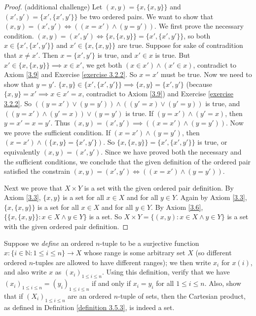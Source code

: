 \begin{proof}{(additional challenge)}
Let \((x, y) = \{x, \{x, y\}\}\) and \((x', y') = \{x', \{x', y'\}\}\) be two ordered pairs.
We want to show that \((x, y) = (x', y') \iff ((x = x') \land (y = y'))\).
We first prove the necessary condition.
\((x, y) = (x', y') \iff \{x, \{x, y\}\} = \{x', \{x', y'\}\}\), so both \(x \in \{x', \{x', y'\}\}\) and \(x' \in \{x, \{x, y\}\}\) are true.
Suppose for sake of contradition that \(x \neq x'\).
Then \(x = \{x', y'\}\) is true, and \(x' \in x\) is true.
But \(x' \in \{x, \{x, y\}\} \implies x \in x'\), we get both \((x \in x') \land (x' \in x)\), contradict to Axiom \ref{3.9} and Exercise \ref{exercise 3.2.2}.
So \(x = x'\) must be true.
Now we need to show that \(y = y'\).
\(\{x, y\} \in \{x', \{x', y'\}\} \implies \{x, y\} = \{x', y'\}\) (because \(\{x, y\} = x' \implies x \in x' = x\), contradict to Axiom \ref{3.9}) and Exercise \ref{exercise 3.2.2}.
So \(((y = x') \lor (y = y')) \land ((y' = x) \lor (y' = y))\) is true, and \(((y = x') \land (y' = x)) \lor (y = y')\) is true.
If \((y = x') \land (y' = x)\), then \(y = x' = x = y'\).
Thus \((x, y) = (x', y') \implies ((x = x') \land (y = y'))\).
Now we prove the sufficient condition.
If \((x = x') \land (y = y')\), then \((x = x') \land (\{x, y\} = \{x', y'\})\).
So \(\{x, \{x, y\}\} = \{x', \{x', y'\}\}\) is true, or equivalently \((x, y) = (x', y')\).
Since we have proved both the necessary and the sufficient conditions, we conclude that the given definition of the ordered pair satisfied the constrain \((x, y) = (x', y') \iff ((x = x') \land (y = y'))\).

Next we prove that \(X \times Y\) is a set with the given ordered pair definition.
By Axiom \ref{3.3}, \(\{x, y\}\) is a set for all \(x \in X\) and for all \(y \in Y\).
Again by Axiom \ref{3.3}, \(\{x, \{x, y\}\}\) is a set for all \(x \in X\) and for all \(y \in Y\).
By Axiom \ref{3.6}, \(\{\{x, \{x, y\}\} : x \in X \land y \in Y\}\) is a set.
So \(X \times Y = \{(x, y) : x \in X \land y \in Y\}\) is a set with the given ordered pair definition.
\end{proof}

\begin{exercise}\label{exercise 3.5.2}
Suppose we \emph{define} an ordered \(n\)-tuple to be a surjective function \(x : \{i \in \mathds{N} : 1 \leq i \leq n\} \to X\) whose range is some arbitrary set \(X\) (so different ordered \(n\)-tuples are allowed to have different ranges);
we then write \(x_i\) for \(x(i)\), and also write \(x\) as \((x_i)_{1 \leq i \leq n}\).
Using this definition, verify that we have \((x_i)_{1 \leq i \leq n} = (y_i)_{1 \leq i \leq n}\) if and only if \(x_i = y_i\) for all \(1 \leq i \leq n\).
Also, show that if \((X_i)_{1 \leq i \leq n}\) are an ordered \(n\)-tuple of sets, then the Cartesian product, as defined in Definition \ref{definition 3.5.3}, is indeed a set.
\end{exercise}

